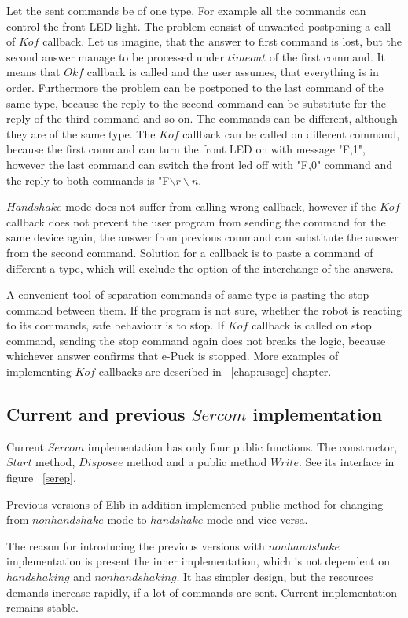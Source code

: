 	Let the sent commands be of one type. For example all the commands can control the front LED light.	
	The problem consist of unwanted postponing a call of $Kof$ callback. 
	Let us imagine, that the answer to first command
	is lost, but the second answer manage to be processed under $timeout$ of the first command.
	It means that $Okf$ callback is called and the user assumes, that everything is in order.
	Furthermore the problem can be postponed to the last command of the same type,
	because the reply to the second command can be substitute for the reply of the third command
	and so on.
	The commands can be different, although they are of the same type.
	The $Kof$ callback can be called on different command, because the first command can turn the front LED on 
	with message "F,1", however the last command can switch the front led off with "F,0" command and 
	the reply to both commands is "F$\backslash r\backslash n$.

	$Handshake$ mode does not suffer from calling wrong callback, however if the $Kof$ callback
	does not prevent the user program from sending the command for the same device again,
	the answer from previous command can substitute the answer from the second command.
	Solution for a callback is to paste a command of different a type, which will exclude the option
	of the interchange of the answers.

	A convenient tool of separation commands of same type is pasting the stop command between them.
	If the program is not sure, whether the robot is reacting to its commands, safe behaviour is to stop.
	If $Kof$ callback is called on stop command, sending the stop command again does not breaks the logic,
	because whichever answer confirms that e-Puck is stopped. More examples of implementing $Kof$ callbacks
	are described in ~\ref{chap:usage} chapter.
\subsection{Current and previous $Sercom$ implementation}\label{sec:versions}
	Current $Sercom$ implementation has only four public functions.
	The constructor, $Start$ method, $Disposee$ method and a public method $Write$. See its interface in figure ~\ref{serep}.	

	Previous versions of Elib in addition implemented public method for changing from $nonhandshake$ mode to 
	$handshake$ mode and vice versa.

	The reason for introducing the previous versions with $nonhandshake$ implementation is present 
	the inner implementation, which is not dependent on $handshaking$ and $nonhandshaking$.
	It has simpler design, but the resources demands increase rapidly, if a lot of commands are sent.
	Current implementation remains stable.
